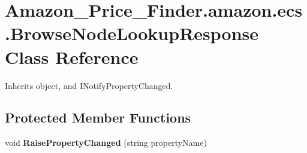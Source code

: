 \hypertarget{class_amazon___price___finder_1_1amazon_1_1ecs_1_1_browse_node_lookup_response}{\section{Amazon\-\_\-\-Price\-\_\-\-Finder.\-amazon.\-ecs.\-Browse\-Node\-Lookup\-Response Class Reference}
\label{class_amazon___price___finder_1_1amazon_1_1ecs_1_1_browse_node_lookup_response}
}


 




Inherits object, and I\-Notify\-Property\-Changed.

\subsection*{Protected Member Functions}
\begin{DoxyCompactItemize}
\item 
\hypertarget{class_amazon___price___finder_1_1amazon_1_1ecs_1_1_browse_node_lookup_response_aa41d8ba913b8369c6c74cc5fc4458f6e}{void {\bfseries Raise\-Property\-Changed} (string property\-Name)}\label{class_amazon___price___finder_1_1amazon_1_1ecs_1_1_browse_node_lookup_response_aa41d8ba913b8369c6c74cc5fc4458f6e}

\end{DoxyCompactItemize}
